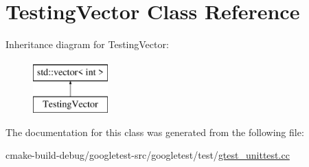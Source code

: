 \hypertarget{classTestingVector}{}\section{Testing\+Vector Class Reference}
\label{classTestingVector}
Inheritance diagram for Testing\+Vector\+:\begin{figure}[H]
\begin{center}
\leavevmode
\includegraphics[height=2.000000cm]{classTestingVector}
\end{center}
\end{figure}


The documentation for this class was generated from the following file\+:\begin{DoxyCompactItemize}
\item 
cmake-\/build-\/debug/googletest-\/src/googletest/test/\mbox{\hyperlink{gtest__unittest_8cc}{gtest\+\_\+unittest.\+cc}}\end{DoxyCompactItemize}
